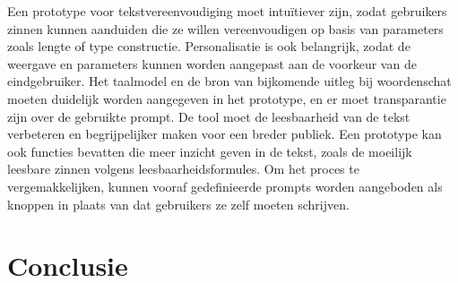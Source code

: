 
Een prototype voor tekstvereenvoudiging moet intuïtiever zijn, zodat gebruikers zinnen kunnen aanduiden die ze willen vereenvoudigen op basis van parameters zoals lengte of type constructie. Personalisatie is ook belangrijk, zodat de weergave en parameters kunnen worden aangepast aan de voorkeur van de eindgebruiker. Het taalmodel en de bron van bijkomende uitleg bij woordenschat moeten duidelijk worden aangegeven in het prototype, en er moet transparantie zijn over de gebruikte prompt. De tool moet de leesbaarheid van de tekst verbeteren en begrijpelijker maken voor een breder publiek. Een prototype kan ook functies bevatten die meer inzicht geven in de tekst, zoals de moeilijk leesbare zinnen volgens leesbaarheidsformules. Om het proces te vergemakkelijken, kunnen vooraf gedefinieerde prompts worden aangeboden als knoppen in plaats van dat gebruikers ze zelf moeten schrijven.

\section{Conclusie}

